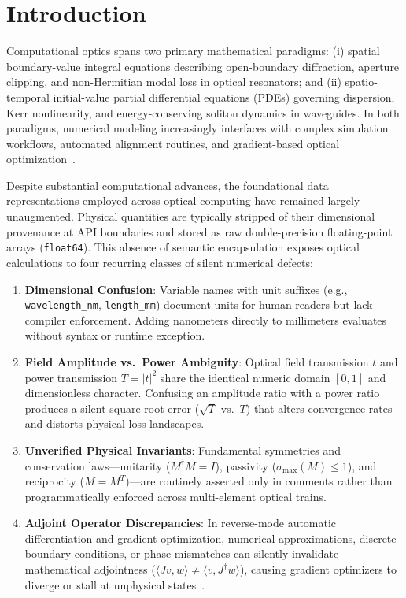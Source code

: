 \documentclass[preprint,12pt]{elsarticle}
\begin{document}
\section{Introduction}
\label{sec:intro}

Computational optics spans two primary mathematical paradigms: (i) spatial boundary-value integral equations describing open-boundary diffraction, aperture clipping, and non-Hermitian modal loss in optical resonators; and (ii) spatio-temporal initial-value partial differential equations (PDEs) governing dispersion, Kerr nonlinearity, and energy-conserving soliton dynamics in waveguides. In both paradigms, numerical modeling increasingly interfaces with complex simulation workflows, automated alignment routines, and gradient-based optical optimization~\cite{Hughes2019}.

Despite substantial computational advances, the foundational data representations employed across optical computing have remained largely unaugmented. Physical quantities are typically stripped of their dimensional provenance at API boundaries and stored as raw double-precision floating-point arrays (\texttt{float64}). This absence of semantic encapsulation exposes optical calculations to four recurring classes of silent numerical defects:
\begin{enumerate}
    \item \textbf{Dimensional Confusion}: Variable names with unit suffixes (e.g., \texttt{wavelength\_nm}, \texttt{length\_mm}) document units for human readers but lack compiler enforcement. Adding nanometers directly to millimeters evaluates without syntax or runtime exception.
    \item \textbf{Field Amplitude vs.\ Power Ambiguity}: Optical field transmission $t$ and power transmission $T = |t|^2$ share the identical numeric domain $[0, 1]$ and dimensionless character. Confusing an amplitude ratio with a power ratio produces a silent square-root error ($\sqrt{T}$ vs.\ $T$) that alters convergence rates and distorts physical loss landscapes.
    \item \textbf{Unverified Physical Invariants}: Fundamental symmetries and conservation laws---unitarity ($M^\dagger M = I$), passivity ($\sigma_{\max}(M) \le 1$), and reciprocity ($M = M^T$)---are routinely asserted only in comments rather than programmatically enforced across multi-element optical trains.
    \item \textbf{Adjoint Operator Discrepancies}: In reverse-mode automatic differentiation and gradient optimization, numerical approximations, discrete boundary conditions, or phase mismatches can silently invalidate mathematical adjointness ($\langle Jv, w \rangle \ne \langle v, J^\dagger w \rangle$), causing gradient optimizers to diverge or stall at unphysical states~\cite{Claerbout1992,Hughes2019}.
\end{enumerate}
\end{document}

